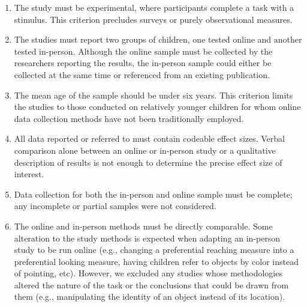 \documentclass[
  man,floatsintext]{apa6}
\begin{document}
\begin{enumerate}
\def\labelenumi{\arabic{enumi}.}
\item
  The study must be experimental, where participants complete a task with a stimulus. This criterion precludes surveys or purely observational measures.
\item
  The studies must report two groups of children, one tested online and another tested in-person. Although the online sample must be collected by the researchers reporting the results, the in-person sample could either be collected at the same time or referenced from an existing publication.
\item
  The mean age of the sample should be under six years. This criterion limits the studies to those conducted on relatively younger children for whom online data collection methods have not been traditionally employed.
\item
  All data reported or referred to must contain codeable effect sizes. Verbal comparison alone between an online or in-person study or a qualitative description of results is not enough to determine the precise effect size of interest.
\item
  Data collection for both the in-person and online sample must be complete; any incomplete or partial samples were not considered.
\item
  The online and in-person methods must be directly comparable. Some alteration to the study methods is expected when adapting an in-person study to be run online (e.g., changing a preferential reaching measure into a preferential looking measure, having children refer to objects by color instead of pointing, etc). However, we excluded any studies whose methodologies altered the nature of the task or the conclusions that could be drawn from them (e.g., manipulating the identity of an object instead of its location).
\end{enumerate}
\end{document}
